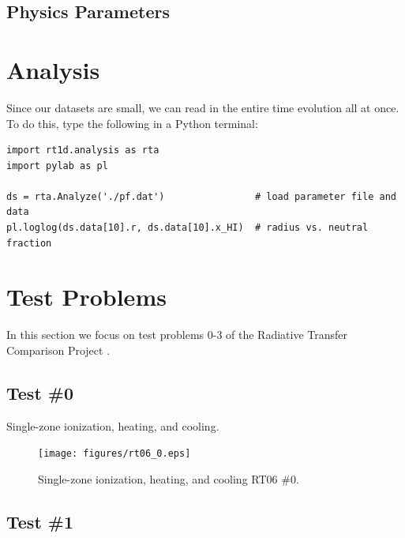 \documentclass[letterpaper,titlepage,12pt]{article}
\numberwithin{equation}{section}
\begin{document}
\subsection{Physics Parameters} \label{sec:PhysicsParameters}


\section{Analysis}
Since our datasets are small, we can read in the entire time evolution all at once.  To do this, type the following in a Python terminal:
\begin{verbatim}
import rt1d.analysis as rta
import pylab as pl

ds = rta.Analyze('./pf.dat')                # load parameter file and data
pl.loglog(ds.data[10].r, ds.data[10].x_HI)  # radius vs. neutral fraction
\end{verbatim}

\section{Test Problems}
In this section we focus on test problems 0-3 of the Radiative Transfer Comparison Project \citep[hereafter RT06;][]{Iliev2006}.

\subsection{Test \#0}
Single-zone ionization, heating, and cooling.

\begin{figure}[htbp!]
\begin{center}
\texttt{[image: figures/rt06\_0.eps]}
\caption{Single-zone ionization, heating, and cooling RT06 \#0.}
\label{fig:RT06_0}
\end{center}
\end{figure}

\subsection{Test \#1}
\end{document}
